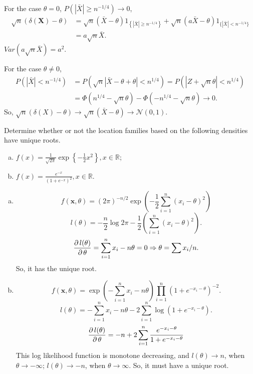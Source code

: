 \begin{solution}
    For the case $\theta=0$, $P(|\bar{X}|\geqslant n^{-1/4})\to 0$, 
    \begin{align*}
        \sqrt{n}(\delta(\mathbf{X})-\theta)&=\sqrt{n}(\bar{X}-\theta) 1_{\left\{|\bar{X}| \geq n^{-1 / 4}\right\}}+\sqrt{n}(a\bar{X}-\theta) 1_{\{|\bar{X}|<n^{-1/4}\}}\\
        &=a\sqrt{n}\bar{X}. 
    \end{align*}
    $Var(a\sqrt{n}\bar{X})=a^2. $

    \noindent For the case $\theta\neq 0$, 
    \[
        \begin{aligned}
            P(|\bar{X}|<n^{-1/4})&=P(\sqrt{n}|\bar{X}-\theta+\theta|<n^{1/4})=P(|Z+\sqrt{n}\theta|<n^{1/4})\\
            &=\Phi(n^{1/4}-\sqrt{n}\theta)-\Phi(-n^{1/4}-\sqrt{n}\theta)\to 0. 
        \end{aligned}
    \]
    So, $\sqrt{n}(\delta(X)-\theta)\to \sqrt{n}(\bar{X}-\theta)\to \mathcal{N}(0,1)$. 
\end{solution}



\begin{ex}
    Determine whether or not the location families based on the following densities have unique roots. 
    \begin{enumerate}[(a)]
        \item \(f(x)=\frac{1}{\sqrt{2 \pi}} \exp \left\{-\frac{1}{2} x^{2}\right\}, x \in \mathbb{R}\); 
        \item \(f(x)=\frac{e^{-x}}{\left(1+e^{-x}\right)^{2}}, x \in \mathbb{R}\). 
    \end{enumerate}
\end{ex}

\begin{solution}
    \begin{enumerate}[(a)]
        \item \[
            f(\mathbf{x}, \theta)=(2\pi)^{-n/2} \exp\left(-\frac{1}{2}\sum_{i=1}^n(x_i-\theta)^2\right)
        \]
        \[
            l(\theta)=-\frac{n}{2}\log 2\pi-\frac{1}{2}\left(\sum_{i=1}^n(x_i-\theta)^2\right). 
        \]
        \[
            \frac{\partial\, l(\theta)}{\partial\, \theta}=\sum_{i=1}^nx_i-n\theta=0\Rightarrow \theta=\sum x_i/n. 
        \]
        So, it has the unique root. 
        \item \[
            f(\mathbf{x}, \theta)=\exp\left(-\sum_{i=1}^n x_i-n\theta\right)\prod_{i=1}^n(1+e^{-x_i-\theta})^{-2}. 
        \]
        \[
            l(\theta)=-\sum_{i=1}^n x_i-n\theta-2\sum_{i=1}^n\log(1+e^{-x_i-\theta}). 
        \]
        \[
            \frac{\partial\, l(\theta)}{\partial\, \theta}=-n+2\sum_{i=1}^n\frac{e^{-x_i-\theta}}{1+e^{-x_i-\theta}}
        \]
        This log likelihood function is monotone decreasing, and $l(\theta)\to n$, when $\theta\to-\infty$; $l(\theta)\to -n$, when $\theta\to\infty$. So, it must have a unique root. 
    \end{enumerate}
\end{solution}

